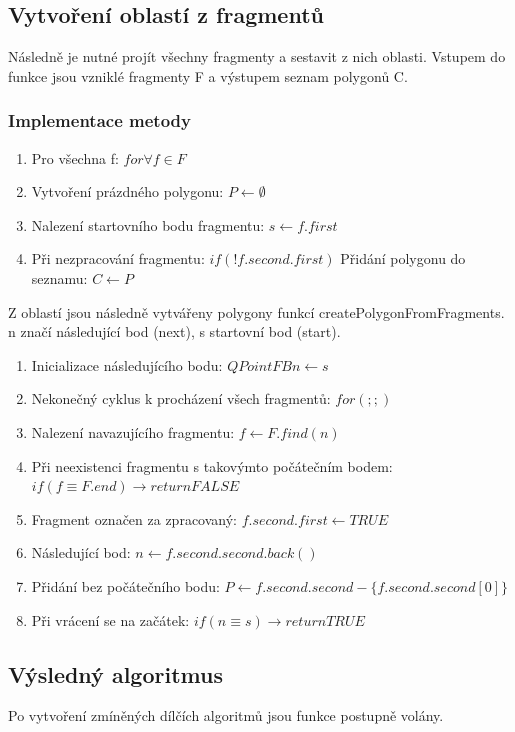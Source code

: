 \documentclass[a4paper, 12pt]{article}
\begin{document}
\subsection{Vytvoření oblastí z fragmentů}
Následně je nutné projít všechny fragmenty a sestavit z nich oblasti. Vstupem do funkce jsou vzniklé fragmenty F a výstupem seznam polygonů C.

\subsubsection{Implementace metody}
\begin{enumerate}
\item Pro všechna f: $ for \forall f \in F$
\item Vytvoření prázdného polygonu: $P \leftarrow \emptyset$
\item Nalezení startovního bodu fragmentu: $s \leftarrow f.first$
\item Při nezpracování fragmentu: $if (!f.second.first)$
\subitem Přidání polygonu do seznamu: $C \leftarrow P$
\end{enumerate}

Z oblastí jsou následně vytvářeny polygony funkcí createPolygonFromFragments. n značí následující bod (next), s startovní bod (start). 

\begin{enumerate}
\item Inicializace následujícího bodu: $QPointFB n \leftarrow s$
\item Nekonečný cyklus k procházení všech fragmentů: $for(;;)$
\item Nalezení navazujícího fragmentu: $f \leftarrow F.find(n)$
\item Při neexistenci fragmentu s takovýmto počátečním bodem: $if(f \equiv F.end) \rightarrow return FALSE$
\item Fragment označen za zpracovaný: $f.second.first \leftarrow TRUE$
\item Následující bod: $n \leftarrow f.second.second.back()$
\item Přidání bez počátečního bodu: $P \leftarrow f.second.second - \{ f.second.second[0]\} $
\item Při vrácení se na začátek: $if (n \equiv s) \rightarrow return TRUE$
\end{enumerate}

\subsection{Výsledný algoritmus}
Po vytvoření zmíněných dílčích algoritmů jsou funkce postupně volány.
\end{document}
